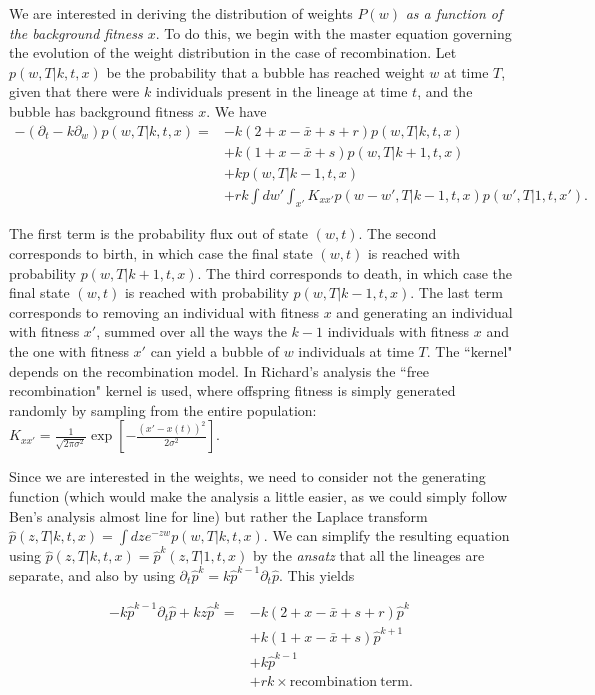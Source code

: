 \documentclass[10pt]{revtex4}
\begin{document}
We are interested in deriving the distribution of weights $P(w)$ \emph{as a function of the background fitness $x$}.
To do this, we begin with the master equation governing the evolution of the weight distribution in the case of recombination.
Let $p(w,T|k,t,x)$ be the probability that a bubble has reached weight $w$ at time $T$, given that there were $k$ individuals present in the lineage at time $t$, and the bubble has background fitness $x$.
We have
\begin{align*}
-(\partial_t -k\partial_w) p(w,T|k,t,x) = &-k(2+x-\bar{x}+s+r)p(w,T|k,t,x) \\
& + k(1+x-\bar{x}+s)p(w,T|k+1,t,x) \\
& +kp(w,T|k-1,t,x) \\
&+rk \int dw\prime \int_{x\prime} K_{x x\prime} p(w-w\prime , T|k-1, t, x) p(w\prime,T|1,t,x\prime).
\end{align*}

The first term is the probability flux out of state $(w,t)$.
The second corresponds to birth, in which case the final state $(w,t)$ is reached with probability $p(w,T|k+1,t,x)$.
The third corresponds to death, in which case the final state $(w,t)$ is reached with probability $p(w,T|k-1,t,x)$.
The last term corresponds to removing an individual with fitness $x$ and generating an individual with fitness $x\prime$, summed over all the ways the $k-1$ individuals with fitness $x$ and the one with fitness $x\prime$ can yield a bubble of $w$ individuals at time $T$.
The ``kernel" depends on the recombination model.
In Richard's analysis the ``free recombination" kernel is used, where offspring fitness is simply generated randomly by sampling from the entire population: $K_{xx\prime} = \frac{1}{\sqrt{2\pi \sigma^2}} \exp \left[ -\frac{(x\prime - x(t))^2}{2\sigma^2} \right]$.

Since we are interested in the weights, we need to consider not the generating function (which would make the analysis a little easier, as we could simply follow Ben's analysis almost line for line) but rather the Laplace transform $\hat{p}(z,T|k,t,x) = \int dz e^{-zw} p(w,T|k,t,x)$.
We can simplify the resulting equation using $\hat{p}(z,T|k,t,x) = \hat{p}^k(z,T|1,t,x)$ by the \emph{ansatz} that all the lineages are separate, and also by using $\partial_t \hat{p}^k = k\hat{p}^{k-1} \partial_t \hat{p}$.
This yields

\begin{align*}
-k\hat{p}^{k-1} \partial_t\hat{p} + kz\hat{p}^k = &-k(2+x-\bar{x}+s+r)\hat{p}^k \\
& + k(1+x-\bar{x}+s)\hat{p}^{k+1} \\
& +k\hat{p}^{k-1} \\
&+rk \times \mathrm{recombination~term}.
\end{align*}
\end{document}
